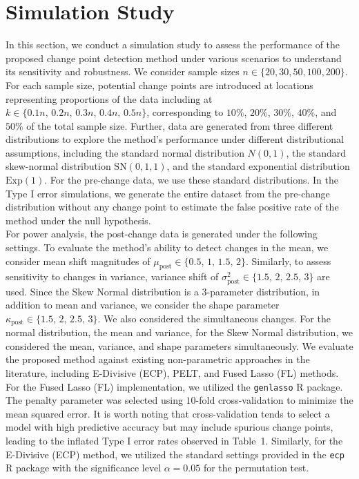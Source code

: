 \documentclass[11pt]{article}
\numberwithin{theorem}{section}
\numberwithin{Lemma}{section}
\numberwithin{Definition}{section}
\begin{document}
\section{Simulation Study}
In this section, we conduct a simulation study to assess the performance of the proposed change point detection method under various scenarios to understand its sensitivity and robustness. We consider sample sizes $n \in \{20, 30, 50, 100, 200\}$. For each sample size, potential change points are introduced at locations representing proportions of the data including at $k \in \{0.1n,\, 0.2n,\, 0.3n,\, 0.4n,\, 0.5n\}$, corresponding to $ 10\% $, $ 20\% $, $ 30\% $, $ 40\% $, and $ 50\% $ of the total sample size. Further, data are generated from three different distributions to explore the method's performance under different distributional assumptions, including the standard normal distribution $N(0,1)$, the standard skew-normal distribution $\mathrm{SN}(0,1,1)$, and the standard exponential distribution $\mathrm{Exp}(1)$. For the pre-change data, we use these standard distributions.  In the Type I error simulations, we generate the entire dataset from the pre-change distribution without any change point to estimate the false positive rate of the method under the null hypothesis. \\ %


For power analysis, the post-change data is generated under the following settings. To evaluate the method's ability to detect changes in the mean, we consider mean shift magnitudes of $ \mu_{\text{post}} \in \{0.5,\, 1,\, 1.5,\, 2\}$. Similarly, to assess sensitivity to changes in variance, variance shift of $\sigma^2_{\text{post}} \in \{1.5,\, 2,\, 2.5,\, 3\}$ are used. Since the Skew Normal distribution is a 3-parameter distribution, in addition to mean and variance, we consider the shape parameter $\kappa_{\text{post}} \in \{1.5,\, 2,\, 2.5,\, 3\}$.  We also considered the simultaneous changes. For the normal distribution,  the mean and variance, for the Skew Normal distribution, we considered the mean, variance, and shape parameters simultaneously.  We evaluate the proposed method against existing non-parametric approaches in the literature, including E-Divisive (ECP), PELT, and Fused Lasso (FL) methods. For the Fused Lasso (FL) implementation, we utilized the \texttt{genlasso} R package. The penalty parameter was selected using $10$-fold cross-validation to minimize the mean squared error. It is worth noting that cross-validation tends to select a model with high predictive accuracy but may include spurious change points, leading to the inflated Type I error rates observed in Table~1. Similarly, for the E-Divisive (ECP) method, we utilized the standard settings provided in the \texttt{ecp} R package with the significance level $\alpha = 0.05$ for the permutation test.
\\
\end{document}
